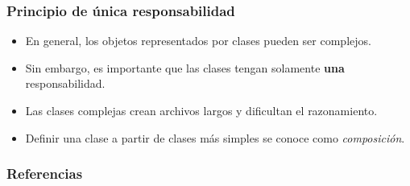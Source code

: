 \documentclass{beamer}
\begin{document}
\begin{frame}
    \frametitle{Principio de \'unica responsabilidad}
    \begin{itemize}
        \item{En general, los objetos representados por clases pueden ser complejos.}
        \item{Sin embargo, es importante que las clases tengan solamente {\bf una} responsabilidad.}
        \item{Las clases complejas crean archivos largos y dificultan el razonamiento.}
        \item{Definir una clase a partir de clases m\'as simples se conoce como \emph{composici\'on}.}
    \end{itemize}
\end{frame}

\begin{frame}
    \frametitle{Referencias}
    
    
\end{frame}
\end{document}

